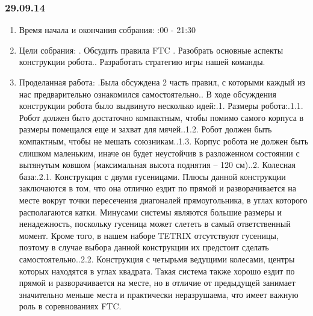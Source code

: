 \documentclass[11pt]{article}
\begin{document}
         \subsubsection{29.09.14}
         \begin{enumerate}
            \item Время начала и окончания собрания:
            :00 - 21:30
            \item Цели собрания:
            . Обсудить правила FTC . Разобрать основные аспекты конструкции робота.. Разработать стратегию игры нашей команды.\newline
            \item Проделанная работа:
            .Была обсуждена 2 часть правил, с которыми каждый из нас предварительно ознакомился самостоятельно..    В ходе обсуждения конструкции робота было выдвинуто несколько идей:.1.   Размеры робота:.1.1.   Робот должен быто достаточно компактным, чтобы помимо самого корпуса в размеры помещался еще и захват для мячей..1.2.   Робот должен быть компактным, чтобы не мешать союзникам..1.3.   Корпус робота не должен быть слишком маленьким, иначе он будет неустойчив в разложенном состоянии с вытянутым ковшом (максимальная высота поднятия – 120 см)..2.   Колесная база:.2.1.   Конструкция с двумя гусеницами. Плюсы данной конструкции заключаются в том, что она отлично ездит по прямой  и разворачивается на месте вокруг точки пересечения диагоналей прямоугольника, в углах которого располагаются катки. Минусами системы являются большие размеры и ненадежность, поскольку гусеница может слететь в самый ответственный момент. Кроме того, в нашем наборе TETRIX отсутствуют гусеницы, поэтому в случае выбора данной конструкции их предстоит сделать самостоятельно..2.2.   Конструкция с четырьмя ведущими колесами, центры которых находятся в углах квадрата. Такая система также хорошо ездит по прямой и разворачивается на месте, но в отличие от предыдущей занимает значительно меньше места и практически неразрушаема, что имеет важную роль в соревнованиях FTC.\newline

\end{enumerate}
\end{document}
